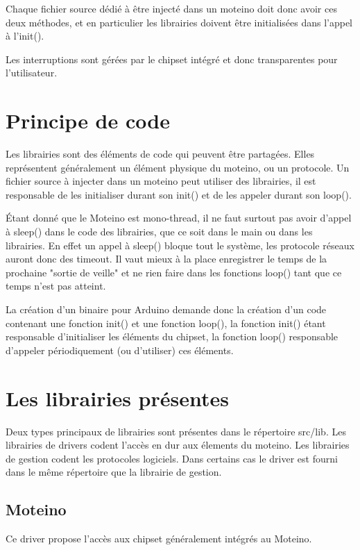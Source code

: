 \documentclass[a4paper]{report}
\begin{document}
Chaque fichier source dédié à être injecté dans un moteino doit donc avoir ces deux méthodes, et en particulier les librairies doivent être initialisées dans l'appel à l'init().

Les interruptions sont gérées par le chipset intégré et donc transparentes pour l'utilisateur.

\section{Principe de code}

Les librairies sont des éléments de code qui peuvent être partagées. Elles représentent généralement un élément physique du moteino, ou un protocole.
Un fichier source à injecter dans un moteino peut utiliser des librairies, il est responsable de les initialiser durant son init() et de les appeler durant son loop().

Étant donné que le Moteino est mono-thread, il ne faut surtout pas avoir d'appel à sleep() dans le code des librairies, que ce soit dans le main ou dans les librairies. En effet un appel à sleep() bloque tout le système, les protocole réseaux auront donc des timeout. Il vaut mieux à la place enregistrer le temps de la prochaine "sortie de veille" et ne rien faire dans les fonctions loop() tant que ce temps n'est pas atteint.

La création d'un binaire pour Arduino demande donc la création d'un code contenant une fonction init() et une fonction loop(), la fonction init() étant responsable d'initialiser les éléments du chipset, la fonction loop() responsable d'appeler périodiquement (ou d'utiliser) ces éléments.

\section{Les librairies présentes}

Deux types principaux de librairies sont présentes dans le répertoire src/lib. Les librairies de drivers codent l'accès en dur aux élements du moteino. Les librairies de gestion codent les protocoles logiciels. Dans certains cas le driver est fourni dans le même répertoire que la librairie de gestion.

\subsection{Moteino}

Ce driver propose l'accès aux chipset généralement intégrés au Moteino.
\end{document}
